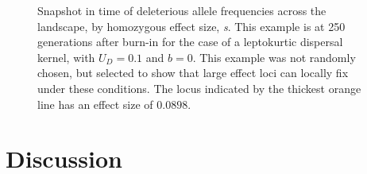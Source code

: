 \begin{figure}[ht]
\centering
{}
\caption[~- Deleterious allele frequencies across the landscape.]{Snapshot in time of deleterious allele frequencies across the landscape, by homozygous effect size, \emph{s}. This example is at 250 generations after burn-in for the case of a leptokurtic dispersal kernel, with $U_D = 0.1$ and $b = 0$. This example was not randomly chosen, but selected to show that large effect loci can locally fix under these conditions. The locus indicated by the thickest orange line has an effect size of $0.0898$.}
\label{fig:allfreqs}
\end{figure}









\section{Discussion}



